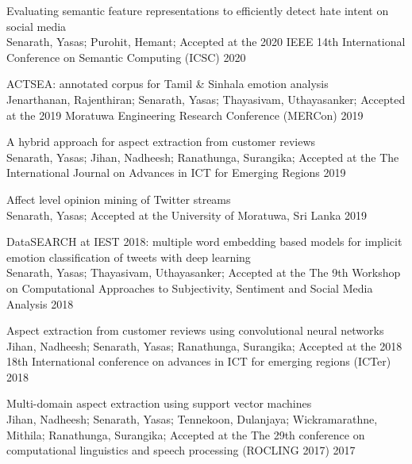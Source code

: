 \begin{rSubsection}{ Evaluating semantic feature representations to efficiently detect hate intent on social media }{\\ Senarath, Yasas; Purohit, Hemant; }{Accepted at the 2020 IEEE 14th International Conference on Semantic Computing (ICSC)}{ 2020 }
\end{rSubsection}

\begin{rSubsection}{ ACTSEA: annotated corpus for Tamil & Sinhala emotion analysis }{\\ Jenarthanan, Rajenthiran; Senarath, Yasas; Thayasivam, Uthayasanker; }{Accepted at the 2019 Moratuwa Engineering Research Conference (MERCon)}{ 2019 }
\end{rSubsection}

\begin{rSubsection}{ A hybrid approach for aspect extraction from customer reviews }{\\ Senarath, Yasas; Jihan, Nadheesh; Ranathunga, Surangika; }{Accepted at the The International Journal on Advances in ICT for Emerging Regions}{ 2019 }
\end{rSubsection}

\begin{rSubsection}{ Affect level opinion mining of Twitter streams }{\\ Senarath, Yasas; }{Accepted at the University of Moratuwa, Sri Lanka}{ 2019 }
\end{rSubsection}

\begin{rSubsection}{ DataSEARCH at IEST 2018: multiple word embedding based models for implicit emotion classification of tweets with deep learning }{\\ Senarath, Yasas; Thayasivam, Uthayasanker; }{Accepted at the The 9th Workshop on Computational Approaches to Subjectivity, Sentiment and Social Media Analysis}{ 2018 }
\end{rSubsection}

\begin{rSubsection}{ Aspect extraction from customer reviews using convolutional neural networks }{\\ Jihan, Nadheesh; Senarath, Yasas; Ranathunga, Surangika; }{Accepted at the 2018 18th International conference on advances in ICT for emerging regions (ICTer)}{ 2018 }
\end{rSubsection}

\begin{rSubsection}{ Multi-domain aspect extraction using support vector machines }{\\ Jihan, Nadheesh; Senarath, Yasas; Tennekoon, Dulanjaya; Wickramarathne, Mithila; Ranathunga, Surangika; }{Accepted at the The 29th conference on computational linguistics and speech processing (ROCLING 2017)}{ 2017 }
\end{rSubsection}

